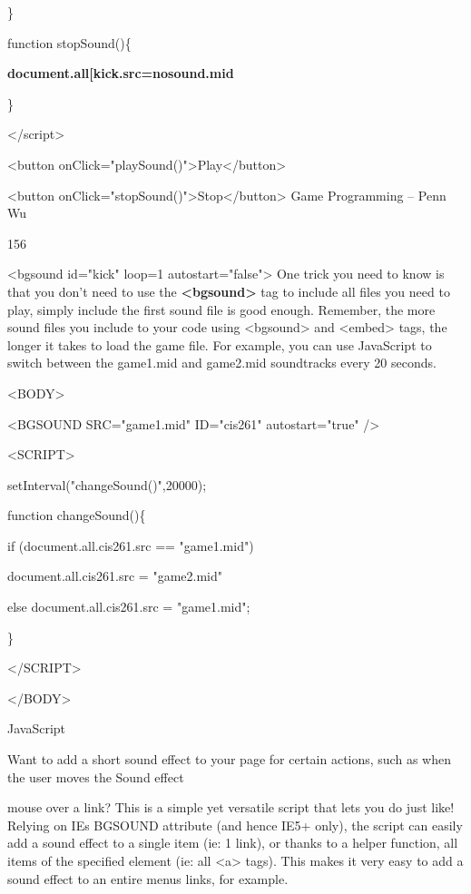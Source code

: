 \documentclass[
]{article}
\begin{document}
\}

function stopSound()\{

\textbf{document.all{[}\textquotesingle kick\textquotesingle{]}.src=\textquotesingle nosound.mid\textquotesingle{}}

\}

\textless/script\textgreater{}

\textless button
onClick="playSound()"\textgreater Play\textless/button\textgreater{}

\textless button
onClick="stopSound()"\textgreater Stop\textless/button\textgreater{}
Game Programming -- Penn Wu

156

\protect\hypertarget{index_split_010.htmlux5cux23p157}{}{}\textless bgsound
id="kick" loop=1 autostart="false"\textgreater{} One trick you need to
know is that you don't need to use the
\textbf{\textless bgsound\textgreater{}} tag to include all files you
need to play, simply include the first sound file is good enough.
Remember, the more sound files you include to your code using
\textless bgsound\textgreater{} and \textless embed\textgreater{} tags,
the longer it takes to load the game file. For example, you can use
JavaScript to switch between the game1.mid and game2.mid soundtracks
every 20 seconds.

\textless BODY\textgreater{}

\textless BGSOUND SRC="game1.mid" ID="cis261" autostart="true"
/\textgreater{}

\textless SCRIPT\textgreater{}

setInterval("changeSound()",20000);

function changeSound()\{

if (document.all.cis261.src == "game1.mid")

document.all.cis261.src = "game2.mid"

else document.all.cis261.src = "game1.mid";

\}

\textless/SCRIPT\textgreater{}

\textless/BODY\textgreater{}

JavaScript

Want to add a short sound effect to your page for certain actions, such
as when the user moves the Sound effect

mouse over a link? This is a simple yet versatile script that lets you
do just like! Relying on IE\textquotesingle s BGSOUND attribute (and
hence IE5+ only), the script can easily add a sound effect to a single
item (ie: 1 link), or thanks to a helper function, all items of the
specified element (ie: all \textless a\textgreater{} tags). This makes
it very easy to add a sound effect to an entire menu\textquotesingle s
links, for example.
\end{document}
